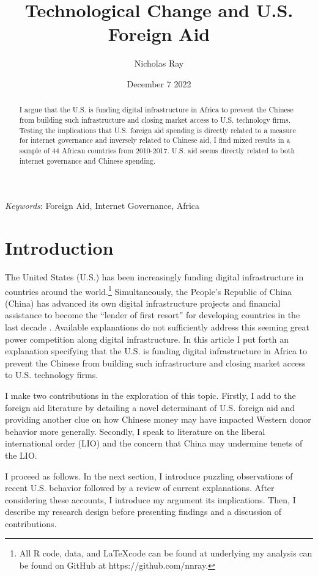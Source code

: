 \documentclass[12pt]{article}
\title{\vspace{-2.75cm}Technological Change and U.S. Foreign Aid\vspace{-0.5cm}}
\author{Nicholas Ray}
\date{\vspace{-0.30cm}December 7 2022\vspace{-1cm}}
\begin{document}
\maketitle
\begin{abstract}
    I argue that the U.S. is funding digital infrastructure in Africa to prevent the Chinese from building such infrastructure and closing market access to U.S. technology firms. Testing the implications that U.S. foreign aid spending is directly related to a measure for internet governance and inversely related to Chinese aid, I find mixed results in a sample of 44 African countries from 2010-2017. U.S. aid seems directly related to both internet governance and Chinese spending.
\end{abstract}

\textit{Keywords}: Foreign Aid, Internet Governance, Africa

\section*{Introduction}
The United States (U.S.) has been increasingly funding digital infrastructure in countries around the world.\footnote{All R code, data, and \LaTeX \;code can be found at  underlying my analysis can be found on GitHub at https://github.com/nnray.} Simultaneously, the People's Republic of China (China) has advanced its own digital infrastructure projects and financial assistance to become the ``lender of first resort'' for developing countries in the last decade \parencite[1]{dreher2022}. Available explanations do not sufficiently address this seeming great power competition along digital infrastructure. In this article I put forth an explanation specifying that the U.S. is funding digital infrastructure in Africa to prevent the Chinese from building such infrastructure and closing market access to U.S. technology firms.

I make two contributions in the exploration of this topic. Firstly, I add to the foreign aid literature by detailing a novel determinant of U.S. foreign aid and providing another clue on how Chinese money may have impacted Western donor behavior more generally. Secondly, I speak to literature on the liberal international order (LIO) and the concern that China may undermine tenets of the LIO. %

I proceed as follows. In the next section, I introduce puzzling observations of recent U.S. behavior followed by a review of current explanations. After considering these accounts, I introduce my argument its implications. Then, I describe my research design before presenting findings and a discussion of contributions.
\end{document}
